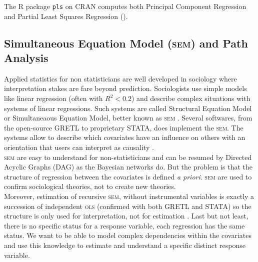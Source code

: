 \documentclass[12pt,a4paper]{report}
\begin{document}
%	
%	
	
	The R package {\tt pls} on CRAN computes both Principal Component Regression and Partial Least Squares Regression (\cite{packagepls}).
		\subsection{Simultaneous Equation Model (\textsc{sem}) and Path Analysis}		%
		Applied statistics  for non statisticians are well developed in sociology where interpretation  stakes are fare beyond prediction. Sociologists use simple models like linear regression (often with $R^2<0.2$) and describe complex situations with systems of linear regressions. Such systems are called Structural Equation Model or Simultaneaous Equation Model, better known as \textsc{sem} \cite{davidson1993estimation}. Several softwares, from the open-source GRETL \cite{CottrellLucchetti2007gretlmanual} to proprietary STATA, does implement the \textsc{sem}. The systems allow to describe which covariates have an influence on others with an orientation that users can interpret as causality \cite{pearl2000causality,pearl1998graphs}. \\
		
		\textsc{sem} are easy to understand for non-statisticians and can be resumed by Directed Acyclic Graphs (DAG) as the Bayesian networks do. But the problem is that the structure of regression between the covariates is defined {\it a priori}. \textsc{sem} are used to confirm sociological theories, not to create new theories. \\
		
		Moreover, estimation of recursive \textsc{sem}, without instrumental variables is exactly a succession of independent \textsc{ols} (confirmed with both GRETL and STATA) so the structure is only used for interpretation, not for estimation \cite{brito2006graphical}. Last but not least, there is no specific status for a response variable, each regression has the same status. We want to be able to model complex dependencies within the covariates and use this knowledge to estimate and understand a specific distinct response variable.
\end{document}
